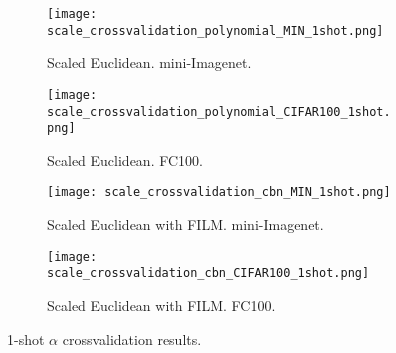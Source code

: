 \documentclass{article}
\begin{document}
\begin{figure}[t]
%
    \centering
    \begin{subfigure}[t]{0.49\textwidth}
        \texttt{[image: scale\_crossvalidation\_polynomial\_MIN\_1shot.png]}
        \caption{Scaled Euclidean. mini-Imagenet.}
        \label{fig:scaled_euclidean_miniimagenet_1shot}
    \end{subfigure}
    \begin{subfigure}[t]{0.49\textwidth}
        \texttt{[image: scale\_crossvalidation\_polynomial\_CIFAR100\_1shot.png]}
        \caption{Scaled Euclidean. FC100.}
        \label{fig:scaled_euclidean_cifar100_1shot}
    \end{subfigure}
    \begin{subfigure}[t]{0.49\textwidth}
        \texttt{[image: scale\_crossvalidation\_cbn\_MIN\_1shot.png]}
        \caption{Scaled Euclidean with FILM. mini-Imagenet.}
        \label{fig:scaled_euclidean_with_tbn_miniimagenet_1shot}
    \end{subfigure}
    \begin{subfigure}[t]{0.49\textwidth}
        \texttt{[image: scale\_crossvalidation\_cbn\_CIFAR100\_1shot.png]}
        \caption{Scaled Euclidean with FILM. FC100.}
        \label{fig:scaled_euclidean_with_tbn_cifar100_1shot}
    \end{subfigure}
    \caption{1-shot $\alpha$ crossvalidation results.}
    \label{fig:metric_scaling_1shot}
\end{figure}
\end{document}
